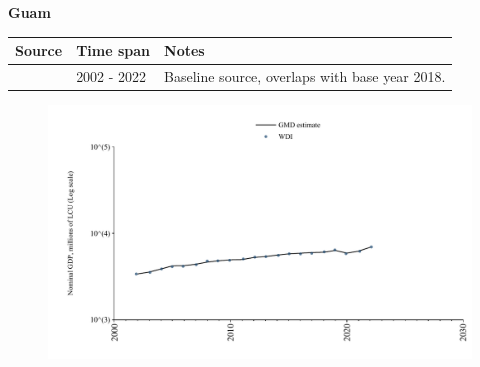 \documentclass[12pt,a4paper,landscape]{article}
\begin{document}
\begin{adjustbox}{max totalsize={\paperwidth}{\paperheight},center}
\begin{minipage}[t][\textheight][t]{\textwidth}
\vspace*{0.5cm}
{}
\begin{center}
{\Large\bfseries Guam}
\end{center}
\vspace{0.5cm}
\begin{table}[H]
\centering
\small
\begin{tabular}{|l|l|l|}
\hline
\textbf{Source} & \textbf{Time span} & \textbf{Notes} \\
\hline
\rowcolor{white}\cite{WDI}& 2002 - 2022 &Baseline source, overlaps with base year 2018.\\
\hline
\end{tabular}
\end{table}
\begin{figure}[H]
\centering
\includegraphics[width=\textwidth,height=0.6\textheight,keepaspectratio]{graphs/GUM_nGDP.pdf}
\end{figure}
\end{minipage}
\end{adjustbox}
\end{document}
